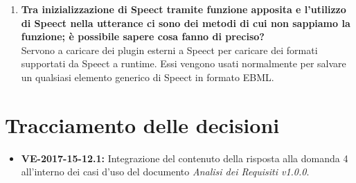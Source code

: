 \documentclass[openany,12pt,a4paper]{article}
\begin{document}
\begin{enumerate}
	\item \textbf{Tra inizializzazione di Speect tramite funzione apposita e l'utilizzo di Speect nella utterance ci sono dei metodi di cui non sappiamo la funzione; è possibile sapere cosa fanno di preciso?}\\ Servono a caricare dei plugin esterni a Speect per caricare dei formati supportati da Speect a runtime. Essi vengono usati normalmente per salvare un qualsiasi elemento generico di Speect in formato EBML.

	\end{enumerate}
	
	\section{Tracciamento delle decisioni}
	
	\begin{itemize}
	    \item \textbf{VE-2017-15-12.1:} Integrazione del contenuto della risposta alla domanda 4 all'interno dei casi d'uso del documento \textit{Analisi dei Requisiti v1.0.0}.
	\end{itemize}
	
	
\end{document}
